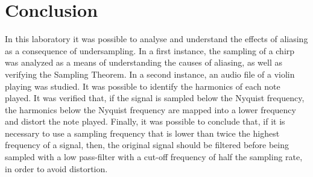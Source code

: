 \documentclass[a4paper, oneside, 11pt]{article}
\begin{document}
\section{Conclusion}
In this laboratory it was possible to analyse and understand the effects of aliasing as a consequence of undersampling. In a first instance, the sampling of a chirp was analyzed as a means of understanding the causes of aliasing, as well as verifying the Sampling Theorem. In a second instance, an audio file of a violin playing was studied. It was possible to identify the harmonics of each note played. It was verified that, if the signal is sampled below the Nyquist frequency, the harmonics below the Nyquist frequency are mapped into a lower frequency and distort the note played. Finally, it was possible to conclude that, if it is necessary to use a sampling frequency that is lower than twice the highest frequency of a signal, then, the original signal should be filtered before being sampled with a low pass-filter with a cut-off frequency of half the sampling rate, in order to avoid distortion.
\end{document}
